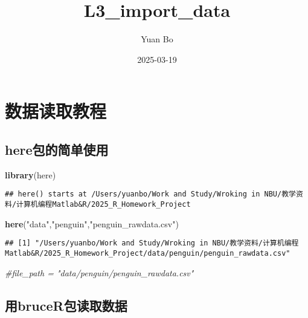 \documentclass[
]{article}
\title{L3\_import\_data}
\author{Yuan Bo}
\date{2025-03-19}
\newenvironment{Shaded}{\begin{snugshade}}{\end{snugshade}}
\newcommand{\CommentTok}[1]{\textcolor[rgb]{0.56,0.35,0.01}{\textit{#1}}}
\newcommand{\FunctionTok}[1]{\textcolor[rgb]{0.13,0.29,0.53}{\textbf{#1}}}
\newcommand{\NormalTok}[1]{#1}
\newcommand{\StringTok}[1]{\textcolor[rgb]{0.31,0.60,0.02}{#1}}
\begin{document}
\maketitle

\section{数据读取教程}\label{ux6570ux636eux8bfbux53d6ux6559ux7a0b}

\subsection{here包的简单使用}\label{hereux5305ux7684ux7b80ux5355ux4f7fux7528}

\begin{Shaded}
\begin{Highlighting}[]
\FunctionTok{library}\NormalTok{(here)}
\end{Highlighting}
\end{Shaded}

\begin{verbatim}
## here() starts at /Users/yuanbo/Work and Study/Wroking in NBU/教学资料/计算机编程Matlab&R/2025_R_Homework_Project
\end{verbatim}

\begin{Shaded}
\begin{Highlighting}[]
\FunctionTok{here}\NormalTok{(}\StringTok{"data"}\NormalTok{,}\StringTok{"penguin"}\NormalTok{,}\StringTok{"penguin\_rawdata.csv"}\NormalTok{)}
\end{Highlighting}
\end{Shaded}

\begin{verbatim}
## [1] "/Users/yuanbo/Work and Study/Wroking in NBU/教学资料/计算机编程Matlab&R/2025_R_Homework_Project/data/penguin/penguin_rawdata.csv"
\end{verbatim}

\begin{Shaded}
\begin{Highlighting}[]
\CommentTok{\#file\_path = "data/penguin/penguin\_rawdata.csv"}
\end{Highlighting}
\end{Shaded}

\subsection{用bruceR包读取数据}\label{ux7528brucerux5305ux8bfbux53d6ux6570ux636e}
\end{document}
